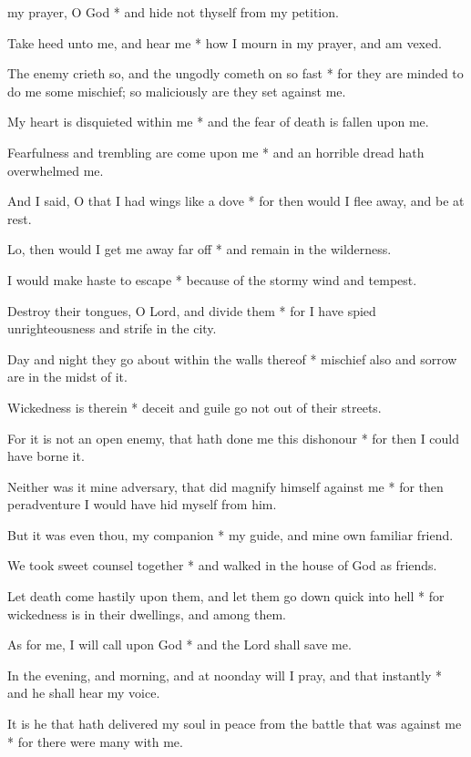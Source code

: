 
 my prayer, O God * and hide not thyself from my petition.

Take heed unto me, and hear me * how I mourn in my prayer, and am vexed.

The enemy crieth so, and the ungodly cometh on so fast * for they are minded to do me some mischief; so maliciously are they set against me.

My heart is disquieted within me * and the fear of death is fallen upon me.

Fearfulness and trembling are come upon me * and an horrible dread hath overwhelmed me.

And I said, O that I had wings like a dove * for then would I flee away, and be at rest.

Lo, then would I get me away far off * and remain in the wilderness.

I would make haste to escape * because of the stormy wind and tempest.

Destroy their tongues, O Lord, and divide them * for I have spied unrighteousness and strife in the city.

Day and night they go about within the walls thereof * mischief also and sorrow are in the midst of it.

Wickedness is therein * deceit and guile go not out of their streets.

For it is not an open enemy, that hath done me this dishonour * for then I could have borne it.

Neither was it mine adversary, that did magnify himself against me * for then peradventure I would have hid myself from him.

But it was even thou, my companion * my guide, and mine own familiar friend.

We took sweet counsel together * and walked in the house of God as friends.

Let death come hastily upon them, and let them go down quick into hell * for wickedness is in their dwellings, and among them.

As for me, I will call upon God * and the Lord shall save me.

In the evening, and morning, and at noonday will I pray, and that instantly * and he shall hear my voice.

It is he that hath delivered my soul in peace from the battle that was against me * for there were many with me.

